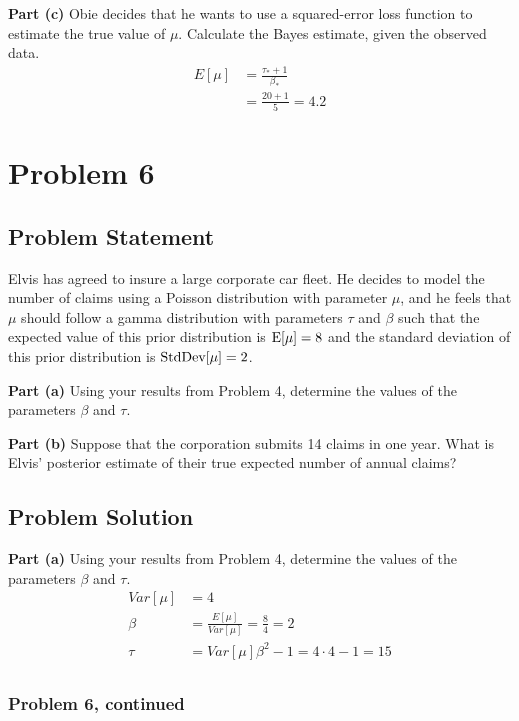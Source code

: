 \documentclass[12pt]{article}
\theoremstyle{definition}
\begin{document}
\noindent
{\bf Part (c)} Obie decides that he wants to use a squared-error loss function to estimate the true value of $\mu$. Calculate the Bayes estimate, given the observed data.
\begin{align*}
E[\mu] &= \frac{\tau_* + 1}{\beta_*}\\
&= \frac{20 + 1}{5} = 4.2
\end{align*}




\newpage
\section*{Problem 6}

\subsection*{Problem Statement}

Elvis has agreed to insure a large corporate car fleet. He decides to model the number of claims using a Poisson distribution with parameter $\mu$, and he feels that $\mu$ should follow a gamma distribution with parameters $\tau$ and $\beta$ such that the expected value of this prior distribution is $\hbox{E}[\mu] = 8$ and the standard deviation of this prior distribution is $\hbox{StdDev}[\mu] = 2$.

\bigskip
\noindent
{\bf Part (a)} Using your results from Problem 4, determine the values of the parameters $\beta$ and $\tau$.

\bigskip
\noindent
{\bf Part (b)} Suppose that the corporation submits 14 claims in one year. What is Elvis' posterior estimate of their true expected number of annual claims?


\subsection*{Problem Solution}

\noindent
{\bf Part (a)} Using your results from Problem 4, determine the values of the parameters $\beta$ and $\tau$.
\begin{align*}
Var[\mu] &= 4\\
\beta &= \frac{E[\mu]}{Var[\mu]} = \frac{8}{4} = 2\\
\tau &= Var[\mu]\beta^2 - 1 = 4 \cdot 4 - 1 = 15\\
\end{align*}
\newpage
\subsubsection*{Problem 6, continued}
\end{document}
